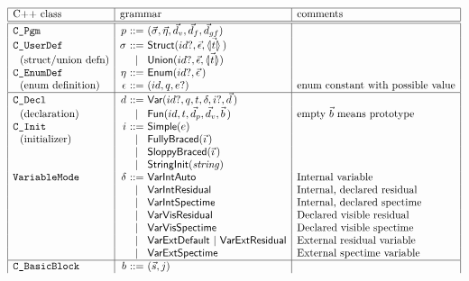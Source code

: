 \begin{docpart}
\begin{figure}\begin{center}
\small\[
\begin{array}{|l|r@{~}c@{~}l|l|}
\hline
  \mbox{C++ class} & \multicolumn{3}{l|}{\mbox{grammar}} & \mbox{comments} \\
\hline\hline
\syntax{C\_Pgm} & p &::=& (\vec\sigma, \vec\eta, \vec d_v,
                                \vec d_f ,\vec d_{gf}) & \\
\syntax{C\_UserDef} & \sigma
        &::=& \cons{Struct}(id?,\vec{\epsilon},\vec{\coreXref t}\,) & \\
\mbox{~~(struct/union defn)}
        &&|& \cons{Union}(id?,\vec{\epsilon},\vec{\coreXref t}) & \\
\syntax{C\_EnumDef} & \eta   &::=& \cons{Enum}(id?,\vec\epsilon\,) & \\
\mbox{~~(enum definition)} & \epsilon &::=& (id,q,e?)
                & \mbox{enum constant with possible value} \\
\hline
\syntax{C\_Decl} & d &::=& \cons{Var}(id?,q,t,\delta,i?,\vec d\,) & \\
\mbox{~~(declaration)}&&|& \cons{Fun}(id,t,\vec d_p,\vec d_v,\vec b\,)
                        & \mbox{empty } \vec b \mbox{ means prototype} \\
\syntax{C\_Init} & i &::=& \cons{Simple}(e) & \\
\mbox{~~(initializer)}&&|& \cons{FullyBraced}(\vec\imath\,) & \\
                 &   & | & \cons{SloppyBraced}(\vec\imath\,) & \\
		 &   & | & \cons{StringInit}(\mathit{string}) & \\
\syntax{VariableMode} & \delta
  &::=& \cons{VarIntAuto}     & \mbox{Internal variable} \\
  &&| & \cons{VarIntResidual} & \mbox{Internal, declared residual} \\
  &&| & \cons{VarIntSpectime} & \mbox{Internal, declared spectime} \\
  &&| & \cons{VarVisResidual} & \mbox{Declared visible residual} \\
  &&| & \cons{VarVisSpectime} & \mbox{Declared visible spectime} \\
  &&| & \cons{VarExtDefault} ~|~
        \cons{VarExtResidual} & \mbox{External residual variable} \\
  &&| & \cons{VarExtSpectime} & \mbox{External spectime variable} \\
\hline
\syntax{C\_BasicBlock}& b &::=& (\vec s,j) & \\

\end{array}\]
\end{center}
\end{figure}
\end{docpart}
